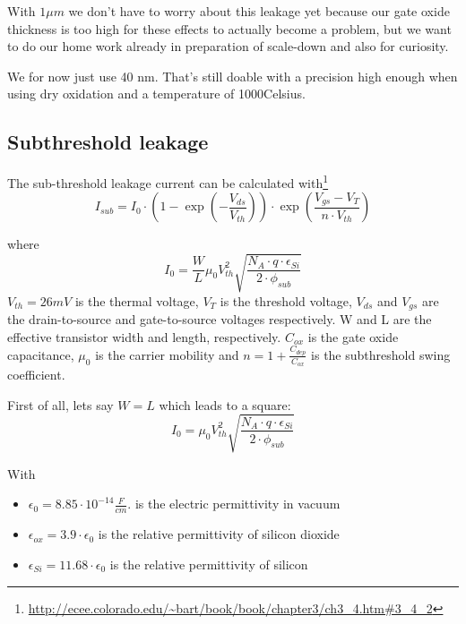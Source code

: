 With $1 \mu m$ we don't have to worry about this leakage yet because our gate oxide thickness is too high for these effects to actually become a problem, but we want to do our home work already in preparation of scale-down and also for curiosity.

We for now just use 40 nm. That's still doable with a precision high enough when using dry oxidation and a temperature of 1000\degree Celsius.

\subsection{Subthreshold leakage}\label{sub_threshold_leakage}

The sub-threshold leakage current can be calculated with\footnote{\url{http://ecee.colorado.edu/\~bart/book/book/chapter3/ch3_4.htm\#3_4_2}}
\begin{equation}
I_{sub}
=
I_0
\cdot
\left(1-\exp\left(-\frac{V_{ds}}{V_{th}}\right)\right)
\cdot
\exp\left(\frac{V_{gs}-V_{T}}{n \cdot V_{th}}\right)
\end{equation}

where
\begin{equation}
I_0 = \frac{W}{L} \mu_0 V_{th}^2 \sqrt{\frac{N_A \cdot q \cdot \epsilon_{Si}}{2 \cdot \phi_{sub}}}
\end{equation}
$V_{th}=26mV$ is the thermal voltage, $V_T$ is the threshold voltage, $V_{ds}$ and $V_{gs}$ are the drain-to-source and gate-to-source voltages respectively.
W and L are the effective transistor width and length, respectively. $C_{ox}$ is the gate oxide capacitance, $\mu_0$ is the carrier mobility and $n=1+\frac{C_{dep}}{C_{ox}}$ is the subthreshold swing coefficient.

First of all, lets say $W=L$ which leads to a square:
\begin{equation}
I_0 = \mu_0 V_{th}^2 \sqrt{\frac{N_A \cdot q \cdot \epsilon_{Si}}{2 \cdot \phi_{sub}}}
\end{equation}

With
\begin{itemize}
\item $\epsilon_0 = 8.85 \cdot 10^{-14}\frac{F}{cm}. $ is the electric permittivity in vacuum
\item $\epsilon_{ox} =3.9 \cdot \epsilon_0$ is the relative permittivity of silicon dioxide
\item $\epsilon_{Si} =11.68 \cdot \epsilon_0$ is the relative permittivity of silicon
\end{itemize}

